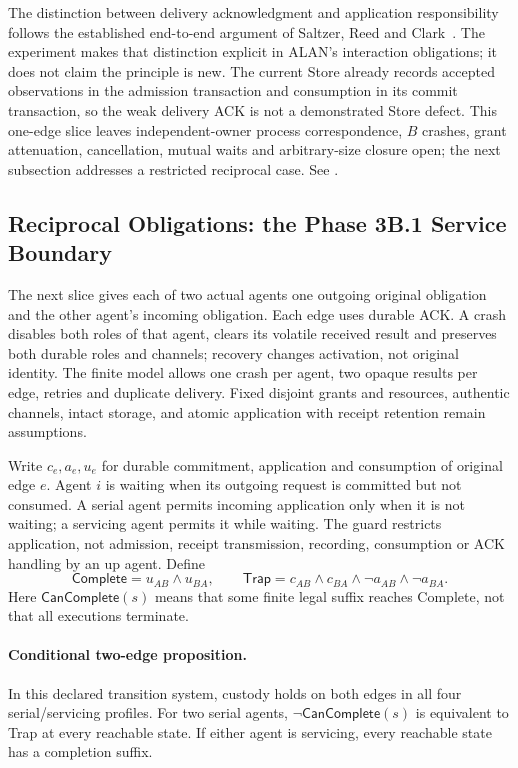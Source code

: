 \documentclass[11pt,a4paper]{article}
\theoremstyle{definition}
\theoremstyle{remark}
\begin{document}
The distinction between delivery acknowledgment and application responsibility follows the established end-to-end argument of Saltzer, Reed and Clark~\cite{saltzer1984endtoend}. The experiment makes that distinction explicit in ALAN's interaction obligations; it does not claim the principle is new. The current Store already records accepted observations in the admission transaction and consumption in its commit transaction, so the weak delivery ACK is not a demonstrated Store defect. This one-edge slice leaves independent-owner process correspondence, $B$ crashes, grant attenuation, cancellation, mutual waits and arbitrary-size closure open; the next subsection addresses a restricted reciprocal case. See .

\subsection{Reciprocal Obligations: the Phase 3B.1 Service Boundary}

The next slice gives each of two actual agents one outgoing original obligation and the other agent's incoming obligation. Each edge uses durable ACK. A crash disables both roles of that agent, clears its volatile received result and preserves both durable roles and channels; recovery changes activation, not original identity. The finite model allows one crash per agent, two opaque results per edge, retries and duplicate delivery. Fixed disjoint grants and resources, authentic channels, intact storage, and atomic application with receipt retention remain assumptions.

Write $c_e,a_e,u_e$ for durable commitment, application and consumption of original edge $e$. Agent $i$ is waiting when its outgoing request is committed but not consumed. A serial agent permits incoming application only when it is not waiting; a servicing agent permits it while waiting. The guard restricts application, not admission, receipt transmission, recording, consumption or ACK handling by an up agent. Define
\[
\mathsf{Complete}=u_{AB}\land u_{BA},\qquad
\mathsf{Trap}=c_{AB}\land c_{BA}\land\neg a_{AB}\land\neg a_{BA}.
\]
Here $\mathsf{CanComplete}(s)$ means that some finite legal suffix reaches Complete, not that all executions terminate.

\paragraph{Conditional two-edge proposition.} In this declared transition system, custody holds on both edges in all four serial/servicing profiles. For two serial agents, $\neg\mathsf{CanComplete}(s)$ is equivalent to Trap at every reachable state. If either agent is servicing, every reachable state has a completion suffix.
\end{document}
